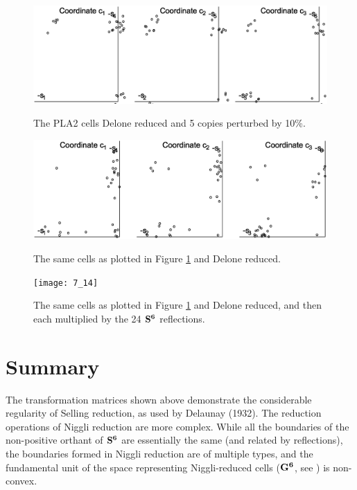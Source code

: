 \documentclass[preprint]{iucr}              %
\numberwithin{equation}{section}
\newcommand{\SVI}[0]{$\bf{S^{6}}$}
\newcommand{\GVI}[0]{$\bf{G^{6}}$}
\begin{document}
	\begin{figure}
		\includegraphics[width=1.0\textwidth]{5_38}
		\label{5_38}
		\caption{The PLA2 cells Delone reduced and
		5 copies perturbed by 10\%.}
	\end{figure}
	
	\begin{figure}
		\includegraphics[width=1.0\textwidth]{6_53}
		\label{6_53}
		\caption{The same cells as plotted in Figure \ref{5_38} 
			and Delone reduced.}
	\end{figure}
	
\begin{figure}
	\texttt{[image: 7\_14]}
	\label{7_14}
		\caption{The same cells as plotted in Figure \ref{5_38} 
	and Delone reduced, and then each multiplied by the 24
	\SVI{} reflections.}
\end{figure}
	
	\section{Summary}
	
	The transformation matrices shown above demonstrate the 
	considerable regularity of Selling reduction, as used by 
	Delaunay (1932). The reduction operations of Niggli 
	reduction \cite{Niggli1928} are more complex. 
	While all the boundaries of the non-positive 
	orthant of \SVI{} are essentially the same (and 
	related by reflections), the boundaries formed in 
	Niggli reduction are of multiple types, and the fundamental unit 
	of the space representing Niggli-reduced cells (\GVI{}, see ) is non-convex.
	
\end{document}
